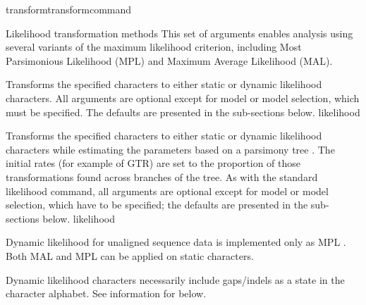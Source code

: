 \begin{command}{transform}{transformcommand}
\begin{arguments}

        \begin{argumentgroup}{Likelihood transformation methods}
            This set of arguments enables analysis using several variants of the
            maximum likelihood criterion, including Most Parsimonious Likelihood (MPL)
            and Maximum Average Likelihood (MAL). 

                {Transforms the specified characters to either static or dynamic
                likelihood characters. All arguments are optional except for model or model selection, 
                which must  be specified.  The defaults are presented in the sub-sections below.}
                {likelihood}

                {Transforms the specified characters to either static or dynamic
                likelihood characters while estimating the parameters based on a
                parsimony tree \cite{wheeler2013}. The initial rates (for example of 
                GTR) are set to the proportion of those transformations found
                across branches of the tree. As with the standard likelihood command,
                all arguments are optional except for model  or model selection, which 
                have to be specified; the defaults are presented in the sub-sections below.}
                {likelihood}

            \begin{statement}
                Dynamic likelihood for unaligned sequence data is
                implemented only as MPL \cite{barryandhartigan1987}. Both MAL and
                MPL can be applied on static characters.
            \end{statement}

            \begin{statement}
                Dynamic likelihood characters necessarily include gaps/indels as
                a state in the character alphabet. See information for
                 below.
            \end{statement}

	\end{argumentgroup}


\end{arguments}
\end{command}
